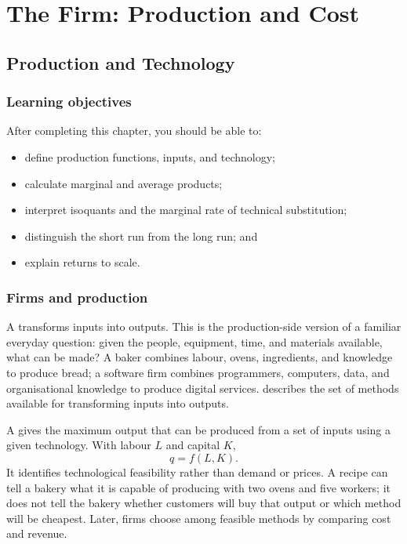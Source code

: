 \part{The Firm: Production and Cost}

\chapter{Production and Technology}
\label{chap:production}

\section{Learning objectives}

After completing this chapter, you should be able to:
\begin{itemize}
  \item define production functions, inputs, and technology;
  \item calculate marginal and average products;
  \item interpret isoquants and the marginal rate of technical substitution;
  \item distinguish the short run from the long run; and
  \item explain returns to scale.
\end{itemize}

\section{Firms and production}

A  transforms inputs into outputs. This is the production-side
version of a familiar everyday question: given the people, equipment, time,
and materials available, what can be made? A baker combines labour, ovens,
ingredients, and knowledge to produce bread; a software firm combines
programmers, computers, data, and organisational knowledge to produce digital
services.  describes the set of methods available for
transforming inputs into outputs.

A  gives the maximum output that can be produced from a set of inputs using a given technology. With labour $L$ and capital $K$,
\[
q=f(L,K).
\]
It identifies technological feasibility rather than demand or prices. A recipe
can tell a bakery what it is capable of producing with two ovens and five
workers; it does not tell the bakery whether customers will buy that output or
which method will be cheapest. Later, firms choose among feasible methods by
comparing cost and revenue.

